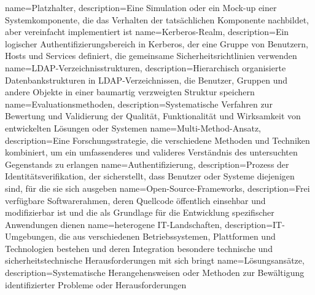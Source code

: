 {
	name={Platz\-hal\-ter},
	description={Eine Si\-mu\-la\-ti\-on oder ein Mock-up ei\-ner Sys\-tem\-kom\-po\-nen\-te, die das Ver\-hal\-ten der tat\-säch\-li\-chen Kom\-po\-nen\-te nach\-bil\-det, aber ver\-ein\-facht im\-ple\-men\-tiert ist}
}
{
	name={Ker\-be\-ros-Realm},
	description={Ein lo\-gi\-scher Au\-then\-ti\-fi\-zie\-rungs\-be\-reich in Ker\-be\-ros, der eine Grup\-pe von Be\-nut\-zern, Hosts und Ser\-vices de\-fi\-niert, die ge\-mein\-sa\-me Si\-cher\-heits\-richt\-li\-ni\-en ver\-wen\-den}
}
{
	name={LDAP-Ver\-zeich\-nis\-struk\-tu\-ren},
	description={Hier\-ar\-chisch or\-ga\-ni\-sier\-te Da\-ten\-bank\-struk\-tu\-ren in LDAP-Ver\-zeich\-nis\-sen, die Be\-nut\-zer, Grup\-pen und an\-de\-re Ob\-jek\-te in ei\-ner baum\-ar\-tig ver\-zweig\-ten Struk\-tur spei\-chern}
}
{
	name={Eva\-lua\-ti\-ons\-me\-tho\-den},
	description={Sys\-te\-ma\-ti\-sche Ver\-fah\-ren zur Be\-wer\-tung und Va\-li\-die\-rung der Qua\-li\-tät, Funk\-tio\-na\-li\-tät und Wirk\-sam\-keit von ent\-wi\-ckel\-ten Lö\-sun\-gen oder Sys\-te\-men}
}
{
	name={Mul\-ti-Me\-thod-An\-satz},
	description={Eine For\-schungs\-stra\-te\-gie, die ver\-schie\-de\-ne Me\-tho\-den und Tech\-ni\-ken kom\-bi\-niert, um ein um\-fas\-sen\-de\-res und va\-li\-de\-res Ver\-ständ\-nis des un\-ter\-such\-ten Ge\-gen\-stands zu er\-lan\-gen}
}
{
	name={Au\-then\-ti\-fi\-zie\-rung},
	description={Prozess der Iden\-ti\-täts\-ve\-ri\-fi\-ka\-ti\-on, der si\-cher\-stellt, dass Be\-nut\-zer oder Sys\-te\-me die\-je\-ni\-gen sind, für die sie sich aus\-ge\-ben}
}
{
	name={Open-Source-Frame\-works},
	description={Frei ver\-füg\-ba\-re Soft\-ware\-rah\-men, de\-ren Quell\-code öf\-fent\-lich ein\-seh\-bar und mo\-di\-fi\-zier\-bar ist und die als Grund\-la\-ge für die Ent\-wick\-lung spe\-zi\-fi\-scher An\-wen\-dun\-gen die\-nen}
}
{
	name={he\-te\-ro\-ge\-ne IT-Land\-schaf\-ten},
	description={IT-Um\-ge\-bun\-gen, die aus ver\-schie\-de\-nen Be\-triebs\-sys\-te\-men, Platt\-for\-men und Tech\-no\-lo\-gi\-en be\-ste\-hen und de\-ren In\-te\-gra\-ti\-on be\-son\-de\-re tech\-ni\-sche und si\-cher\-heits\-tech\-ni\-sche Her\-aus\-for\-de\-run\-gen mit sich bringt}
}
{
	name={Lö\-sungs\-an\-sät\-ze},
	description={Sys\-te\-ma\-ti\-sche Her\-an\-ge\-hens\-wei\-sen oder Me\-tho\-den zur Be\-wäl\-ti\-gung iden\-ti\-fi\-zier\-ter Pro\-ble\-me oder Her\-aus\-for\-de\-run\-gen}
}
